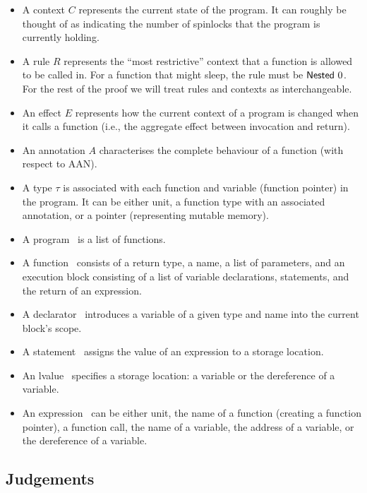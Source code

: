 \documentclass{article}
\begin{document}
\begin{itemize}
	\item A context $C$ represents the current state of the program. It can roughly be thought of as indicating the number of spinlocks that the program is currently holding.
	\item A rule $R$ represents the ``most restrictive'' context that a function is allowed to be called in. For a function that might sleep, the rule must be ${\sf Nested}~ 0$. For the rest of the proof we will treat rules and contexts as interchangeable.
	\item An effect $E$ represents how the current context of a program is changed when it calls a function (i.e., the aggregate effect between invocation and return).
	\item An annotation $A$ characterises the complete behaviour of a function (with respect to AAN).
	\item A type $\tau$ is associated with each function and variable (function pointer) in the program. It can be either unit, a function type with an associated annotation, or a pointer (representing mutable memory).
	\item A program \prog~is a list of functions.
	\item A function \fn~consists of a return type, a name, a list of parameters, and an execution block consisting of a list of variable declarations, statements, and the return of an expression.
	\item A declarator \decl~introduces a variable of a given type and name into the current block's scope.
	\item A statement \stmt~assigns the value of an expression to a storage location.
	\item An lvalue \lv~specifies a storage location: a variable or the dereference of a variable.
	\item An expression \expr~can be either unit, the name of a function (creating a function pointer), a function call, the name of a variable, the address of a variable, or the dereference of a variable.
\end{itemize}

\subsection{Judgements}
\end{document}
